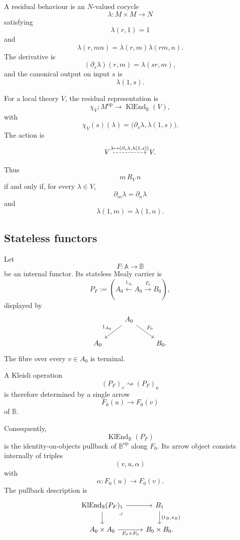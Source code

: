 A residual behaviour is an \(N\)-valued cocycle
\[
    \lambda:M\times M\to N
\]
satisfying
\[
    \lambda(r,1)=1
\]
and
\[
    \lambda(r,mn)
    =
    \lambda(r,m)\lambda(rm,n).
\]
The derivative is
\[
    (\partial_s\lambda)(r,m)
    =
    \lambda(sr,m),
\]
and the canonical output on input \(s\) is
\[
    \lambda(1,s).
\]

For a local theory \(V\), the residual representation is
\[
    \chi_V:
    M^{\mathrm{op}}
    \to
    \operatorname{KlEnd}_{\mathbb B}(V),
\]
with
\[
    \chi_V(s)(\lambda)
    =
    \bigl(
        \partial_s\lambda,
        \lambda(1,s)
    \bigr).
\]
The action is
\[
\begin{tikzcd}[column sep=huge]
    V
        \arrow[r, dashed,
        "{\lambda\mapsto(\partial_s\lambda,\lambda(1,s))}"]
    &
    V.
\end{tikzcd}
\]

Thus
\[
    m\,R_V\,n
\]
if and only if, for every \(\lambda\in V\),
\[
    \partial_m\lambda
    =
    \partial_n\lambda
\]
and
\[
    \lambda(1,m)=\lambda(1,n).
\]

\subsection{Stateless functors}
\label{subsec:to-stateless-functors}

Let
\[
    F:\mathbb A\to\mathbb B
\]
be an internal functor. Its stateless Mealy carrier is
\[
    P_F
    :=
    \left(
        A_0\xleftarrow{1_{A_0}}A_0\xrightarrow{F_0}B_0
    \right),
\]
displayed by
\[
\begin{tikzcd}
    &
    A_0
        \arrow[dl, "1_{A_0}"']
        \arrow[dr, "F_0"]
    &
    \\
    A_0
    &&
    B_0.
\end{tikzcd}
\]
The fibre over every \(v\in A_0\) is terminal.

A Kleisli operation
\[
    (P_F)_v\rightsquigarrow(P_F)_u
\]
is therefore determined by a single arrow
\[
    F_0(u)\to F_0(v)
\]
of \(\mathbb B\).

Consequently,
\[
    \operatorname{KlEnd}_{\mathbb B}(P_F)
\]
is the identity-on-objects pullback of \(\mathbb B^{\mathrm{op}}\) along
\(F_0\). Its arrow object consists internally of triples
\[
    (v,u,\alpha)
\]
with
\[
    \alpha:F_0(u)\to F_0(v).
\]
The pullback description is
\[
\begin{tikzcd}
    \operatorname{KlEnd}_{\mathbb B}(P_F)_1
        \arrow[r]
        \arrow[d]
        \arrow[dr, phantom, "\lrcorner", very near start]
    &
    B_1
        \arrow[d, "{(t_B,s_B)}"]
    \\
    A_0\times A_0
        \arrow[r, "{F_0\times F_0}"']
    &
    B_0\times B_0.
\end{tikzcd}
\]

